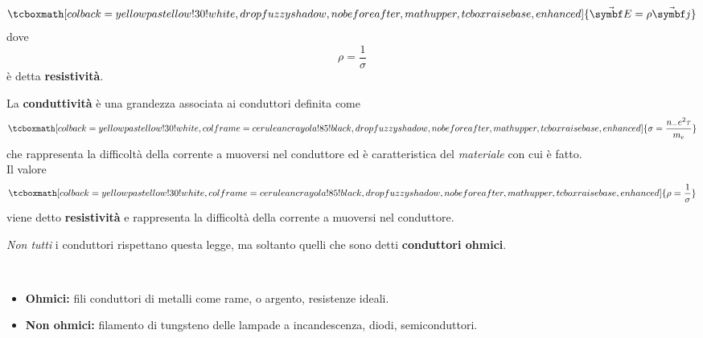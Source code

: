 \begin{equation}
	\tcboxmath[colback=yellowpastellow!30!white,drop fuzzy shadow, nobeforeafter, math upper, tcbox raise base, enhanced]{\vba{E}=\rho\vba{j}}
\end{equation}
dove
\begin{equation*}
	\rho=\frac{1}{\sigma}
\end{equation*}
è detta \textbf{resistività}.
\begin{define}
	La \textbf{conduttività} è una grandezza associata ai conduttori definita come
	\begin{equation}
		\tcboxmath[colback=yellowpastellow!30!white,colframe=ceruleancrayola!85!black,drop fuzzy shadow, nobeforeafter, math upper, tcbox raise base, enhanced]{\sigma=\frac{n_{-}e^2\tau}{m_{e}}}
	\end{equation}
	che rappresenta la difficoltà della corrente a muoversi nel conduttore ed è caratteristica del \textit{materiale} con cui è fatto.\\
	Il valore
	\begin{equation}
		\tcboxmath[colback=yellowpastellow!30!white,colframe=ceruleancrayola!85!black,drop fuzzy shadow, nobeforeafter, math upper, tcbox raise base, enhanced]{\rho=\frac{1}{\sigma}}
	\end{equation}
	viene detto \textbf{resistività} e rappresenta la difficoltà della corrente a muoversi nel conduttore.
\end{define}
\textit{Non tutti} i conduttori rispettano questa legge, ma soltanto quelli che sono detti \textbf{conduttori ohmici}.
\begin{exampleswt}~
	\begin{itemize}
		\item \textbf{Ohmici:} fili conduttori di metalli come rame, o argento, resistenze ideali.
		\item \textbf{Non ohmici:} filamento di tungsteno delle lampade a incandescenza, diodi, semiconduttori.
	\end{itemize}
\end{exampleswt}
